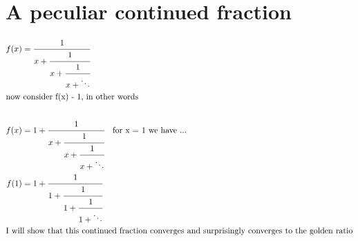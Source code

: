 \documentclass[a4paper]{article}
\begin{document}
\section*{A peculiar continued fraction}
\begin{align*}
    f(x) &= \cfrac{1}{x + \cfrac{1}{x + \cfrac{1}{x + \ddots}}} \\
    \intertext{now consider f(x) - 1, in other words} \\
    f(x) &= 1 + \cfrac{1}{x + \cfrac{1}{x + \cfrac{1}{x + \ddots}}} \quad \text{for x = 1 we have ...}\\
    f(1) &= 1 + \cfrac{1}{1 + \cfrac{1}{1 + \cfrac{1}{1 + \ddots}}}\\
    \intertext{I will show that this continued fraction converges and surprisingly converges to the golden ratio}
\end{align*}
\end{document}
